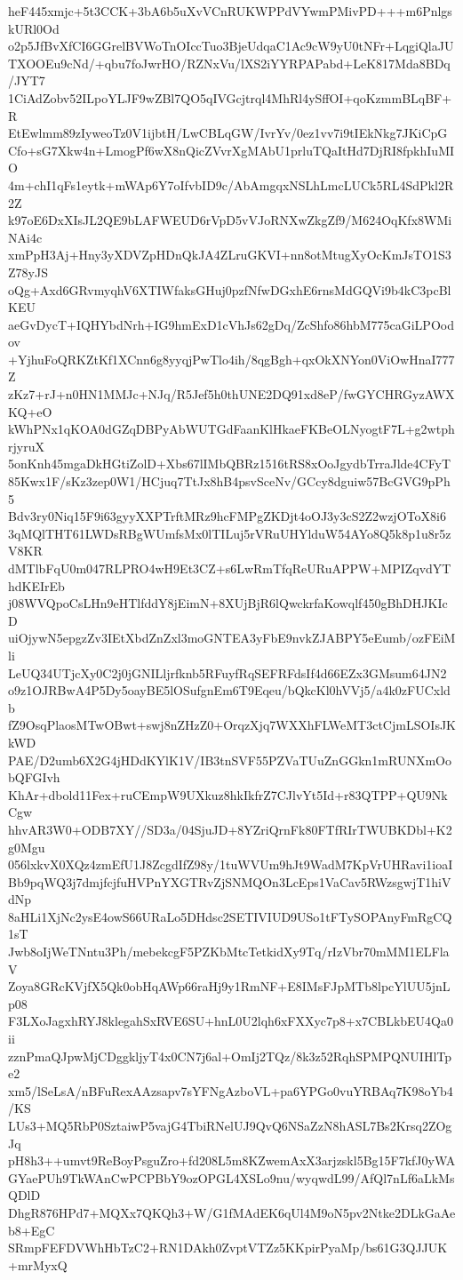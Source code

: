 heF445xmjc+5t3CCK+3bA6b5uXvVCnRUKWPPdVYwmPMivPD+++m6PnlgskURl0Od
o2p5JfBvXfCI6GGrelBVWoTnOIccTuo3BjeUdqaC1Ac9cW9yU0tNFr+LqgiQlaJU
TXOOEu9cNd/+qbu7foJwrHO/RZNxVu/lXS2iYYRPAPabd+LeK817Mda8BDq/JYT7
1CiAdZobv52ILpoYLJF9wZBl7QO5qIVGcjtrql4MhRl4ySffOI+qoKzmmBLqBF+R
EtEwlmm89zIyweoTz0V1ijbtH/LwCBLqGW/IvrYv/0ez1vv7i9tIEkNkg7JKiCpG
Cfo+sG7Xkw4n+LmogPf6wX8nQicZVvrXgMAbU1prluTQaItHd7DjRI8fpkhIuMIO
4m+chI1qFs1eytk+mWAp6Y7oIfvbID9c/AbAmgqxNSLhLmcLUCk5RL4SdPkl2R2Z
k97oE6DxXIsJL2QE9bLAFWEUD6rVpD5vVJoRNXwZkgZf9/M624OqKfx8WMiNAi4c
xmPpH3Aj+Hny3yXDVZpHDnQkJA4ZLruGKVI+nn8otMtugXyOcKmJsTO1S3Z78yJS
oQg+Axd6GRvmyqhV6XTIWfaksGHuj0pzfNfwDGxhE6rnsMdGQVi9b4kC3pcBlKEU
aeGvDycT+IQHYbdNrh+IG9hmExD1cVhJs62gDq/ZcShfo86hbM775caGiLPOodov
+YjhuFoQRKZtKf1XCnn6g8yyqjPwTlo4ih/8qgBgh+qxOkXNYon0ViOwHnaI777Z
zKz7+rJ+n0HN1MMJc+NJq/R5Jef5h0thUNE2DQ91xd8eP/fwGYCHRGyzAWXKQ+eO
kWhPNx1qKOA0dGZqDBPyAbWUTGdFaanKlHkaeFKBeOLNyogtF7L+g2wtphrjyruX
5onKnh45mgaDkHGtiZolD+Xbs67lIMbQBRz1516tRS8xOoJgydbTrraJlde4CFyT
85Kwx1F/sKz3zep0W1/HCjuq7TtJx8hB4psvSceNv/GCcy8dguiw57BcGVG9pPh5
Bdv3ry0Niq15F9i63gyyXXPTrftMRz9hcFMPgZKDjt4oOJ3y3cS2Z2wzjOToX8i6
3qMQlTHT61LWDsRBgWUmfsMx0lTILuj5rVRuUHYlduW54AYo8Q5k8p1u8r5zV8KR
dMTlbFqU0m047RLPRO4wH9Et3CZ+s6LwRmTfqReURuAPPW+MPIZqvdYThdKEIrEb
j08WVQpoCsLHn9eHTlfddY8jEimN+8XUjBjR6lQwckrfaKowqlf450gBhDHJKIcD
uiOjywN5epgzZv3IEtXbdZnZxl3moGNTEA3yFbE9nvkZJABPY5eEumb/ozFEiMli
LeUQ34UTjcXy0C2j0jGNILljrfknb5RFuyfRqSEFRFdsIf4d66EZx3GMsum64JN2
o9z1OJRBwA4P5Dy5oayBE5lOSufgnEm6T9Eqeu/bQkcKl0hVVj5/a4k0zFUCxldb
fZ9OsqPlaosMTwOBwt+swj8nZHzZ0+OrqzXjq7WXXhFLWeMT3ctCjmLSOIsJKkWD
PAE/D2umb6X2G4jHDdKYlK1V/IB3tnSVF55PZVaTUuZnGGkn1mRUNXmOobQFGIvh
KhAr+dbold11Fex+ruCEmpW9UXkuz8hkIkfrZ7CJlvYt5Id+r83QTPP+QU9NkCgw
hhvAR3W0+ODB7XY//SD3a/04SjuJD+8YZriQrnFk80FTfRIrTWUBKDbl+K2g0Mgu
056lxkvX0XQz4zmEfU1J8ZcgdIfZ98y/1tuWVUm9hJt9WadM7KpVrUHRavi1ioaI
Bb9pqWQ3j7dmjfcjfuHVPnYXGTRvZjSNMQOn3LcEps1VaCav5RWzsgwjT1hiVdNp
8aHLi1XjNc2ysE4owS66URaLo5DHdsc2SETIVIUD9USo1tFTySOPAnyFmRgCQ1sT
Jwb8oIjWeTNntu3Ph/mebekcgF5PZKbMtcTetkidXy9Tq/rIzVbr70mMM1ELFlaV
Zoya8GRcKVjfX5Qk0obHqAWp66raHj9y1RmNF+E8IMsFJpMTb8lpcYlUU5jnLp08
F3LXoJagxhRYJ8klegahSxRVE6SU+hnL0U2lqh6xFXXyc7p8+x7CBLkbEU4Qa0ii
zznPmaQJpwMjCDggkljyT4x0CN7j6al+OmIj2TQz/8k3z52RqhSPMPQNUIHlTpe2
xm5/lSeLsA/nBFuRexAAzsapv7sYFNgAzboVL+pa6YPGo0vuYRBAq7K98oYb4/KS
LUs3+MQ5RbP0SztaiwP5vajG4TbiRNelUJ9QvQ6NSaZzN8hASL7Bs2Krsq2ZOgJq
pH8h3++umvt9ReBoyPsguZro+fd208L5m8KZwemAxX3arjzskl5Bg15F7kfJ0yWA
GYaePUh9TkWAnCwPCPBbY9ozOPGL4XSLo9nu/wyqwdL99/AfQl7nLf6aLkMsQDlD
DhgR876HPd7+MQXx7QKQh3+W/G1fMAdEK6qUl4M9oN5pv2Ntke2DLkGaAeb8+EgC
SRmpFEFDVWhHbTzC2+RN1DAkh0ZvptVTZz5KKpirPyaMp/bs61G3QJJUK+mrMyxQ
